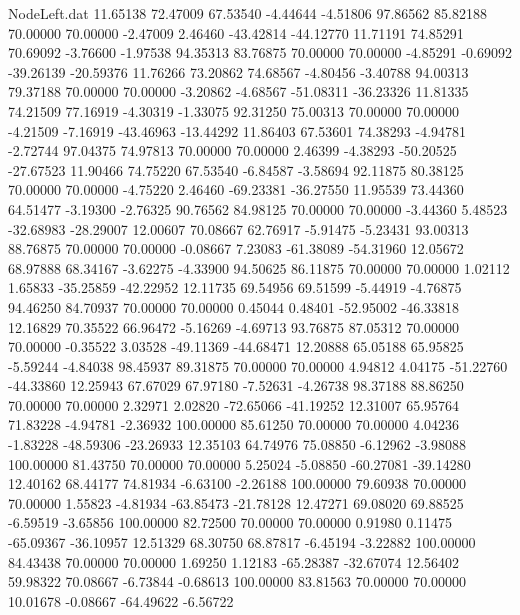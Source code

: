 \begin{filecontents}{NodeLeft.dat}
  11.65138   72.47009   67.53540    -4.44644   -4.51806   97.86562   85.82188   70.00000   70.00000   -2.47009    2.46460  -43.42814  -44.12770
  11.71191   74.85291   70.69092    -3.76600   -1.97538   94.35313   83.76875   70.00000   70.00000   -4.85291   -0.69092  -39.26139  -20.59376
  11.76266   73.20862   74.68567    -4.80456   -3.40788   94.00313   79.37188   70.00000   70.00000   -3.20862   -4.68567  -51.08311  -36.23326
  11.81335   74.21509   77.16919    -4.30319   -1.33075   92.31250   75.00313   70.00000   70.00000   -4.21509   -7.16919  -43.46963  -13.44292
  11.86403   67.53601   74.38293    -4.94781   -2.72744   97.04375   74.97813   70.00000   70.00000    2.46399   -4.38293  -50.20525  -27.67523
  11.90466   74.75220   67.53540    -6.84587   -3.58694   92.11875   80.38125   70.00000   70.00000   -4.75220    2.46460  -69.23381  -36.27550
  11.95539   73.44360   64.51477    -3.19300   -2.76325   90.76562   84.98125   70.00000   70.00000   -3.44360    5.48523  -32.68983  -28.29007
  12.00607   70.08667   62.76917    -5.91475   -5.23431   93.00313   88.76875   70.00000   70.00000   -0.08667    7.23083  -61.38089  -54.31960
  12.05672   68.97888   68.34167    -3.62275   -4.33900   94.50625   86.11875   70.00000   70.00000    1.02112    1.65833  -35.25859  -42.22952
  12.11735   69.54956   69.51599    -5.44919   -4.76875   94.46250   84.70937   70.00000   70.00000    0.45044    0.48401  -52.95002  -46.33818
  12.16829   70.35522   66.96472    -5.16269   -4.69713   93.76875   87.05312   70.00000   70.00000   -0.35522    3.03528  -49.11369  -44.68471
  12.20888   65.05188   65.95825    -5.59244   -4.84038   98.45937   89.31875   70.00000   70.00000    4.94812    4.04175  -51.22760  -44.33860
  12.25943   67.67029   67.97180    -7.52631   -4.26738   98.37188   88.86250   70.00000   70.00000    2.32971    2.02820  -72.65066  -41.19252
  12.31007   65.95764   71.83228    -4.94781   -2.36932  100.00000   85.61250   70.00000   70.00000    4.04236   -1.83228  -48.59306  -23.26933
  12.35103   64.74976   75.08850    -6.12962   -3.98088  100.00000   81.43750   70.00000   70.00000    5.25024   -5.08850  -60.27081  -39.14280
  12.40162   68.44177   74.81934    -6.63100   -2.26188  100.00000   79.60938   70.00000   70.00000    1.55823   -4.81934  -63.85473  -21.78128
  12.47271   69.08020   69.88525    -6.59519   -3.65856  100.00000   82.72500   70.00000   70.00000    0.91980    0.11475  -65.09367  -36.10957
  12.51329   68.30750   68.87817    -6.45194   -3.22882  100.00000   84.43438   70.00000   70.00000    1.69250    1.12183  -65.28387  -32.67074
  12.56402   59.98322   70.08667    -6.73844   -0.68613  100.00000   83.81563   70.00000   70.00000   10.01678   -0.08667  -64.49622   -6.56722

\end{filecontents}
